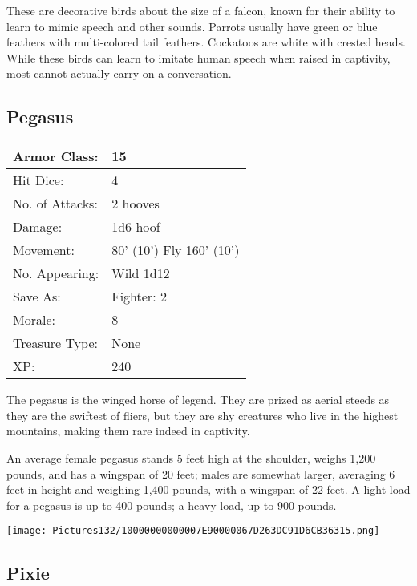 \documentclass[a4paper,twoside,openany,10pt]{book}
\begin{document}
\begin{multicols}{2}
These are decorative birds about the size of a falcon, known for their ability to learn to mimic speech and other sounds. Parrots usually have green or blue feathers with multi-colored tail feathers. Cockatoos are white with crested heads. While these birds can learn to imitate human speech when raised in captivity, most cannot actually carry on a conversation.

\subsection*{Pegasus}\label{pegasus}

\begin{tabularx}{0.50\textwidth}{@{}lX@{}}
Armor Class: & 15 \\\hline
Hit Dice: & 4 \\\hline
No. of Attacks: & 2 hooves \\\hline
Damage: & 1d6 hoof \\\hline
Movement: & 80' (10') Fly
160' (10') \\\hline
No. Appearing: & Wild 1d12 \\\hline
Save As: & Fighter: 2 \\\hline
Morale: & 8 \\\hline
Treasure Type: & None \\\hline
XP: & 240 \\\hline
\end{tabularx}\medskip

The pegasus is the winged horse of legend. They are prized as aerial steeds as they are the swiftest of fliers, but they are shy creatures who live in the highest mountains, making them rare indeed in captivity. 

An average female pegasus stands 5 feet high at the shoulder, weighs 1,200 pounds, and has a wingspan of 20 feet; males are somewhat larger, averaging 6 feet in height and weighing 1,400 pounds, with a wingspan of 22 feet. A light load for a pegasus is up to 400 pounds; a heavy load, up to 900 pounds.

 \begin{center}
 	\texttt{[image: Pictures132/10000000000007E90000067D263DC91D6CB36315.png]} 
 \end{center}

\subsection*{Pixie}\label{pixie}


\end{multicols}
\end{document}
